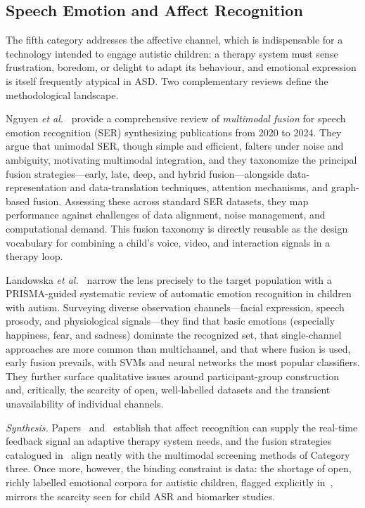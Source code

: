 \documentclass[conference]{IEEEtran}
\begin{document}
\subsection{Speech Emotion and Affect Recognition}
The fifth category addresses the affective channel, which is indispensable for a technology intended to engage autistic children: a therapy system must sense frustration, boredom, or delight to adapt its behaviour, and emotional expression is itself frequently atypical in ASD. Two complementary reviews define the methodological landscape.

Nguyen \textit{et al.}~\cite{ref18} provide a comprehensive review of \emph{multimodal fusion} for speech emotion recognition (SER) synthesizing publications from 2020 to 2024. They argue that unimodal SER, though simple and efficient, falters under noise and ambiguity, motivating multimodal integration, and they taxonomize the principal fusion strategies---early, late, deep, and hybrid fusion---alongside data-representation and data-translation techniques, attention mechanisms, and graph-based fusion. Assessing these across standard SER datasets, they map performance against challenges of data alignment, noise management, and computational demand. This fusion taxonomy is directly reusable as the design vocabulary for combining a child's voice, video, and interaction signals in a therapy loop.

Landowska \textit{et al.}~\cite{ref19} narrow the lens precisely to the target population with a PRISMA-guided systematic review of automatic emotion recognition in children with autism. Surveying diverse observation channels---facial expression, speech prosody, and physiological signals---they find that basic emotions (especially happiness, fear, and sadness) dominate the recognized set, that single-channel approaches are more common than multichannel, and that where fusion is used, early fusion prevails, with SVMs and neural networks the most popular classifiers. They further surface qualitative issues around participant-group construction and, critically, the scarcity of open, well-labelled datasets and the transient unavailability of individual channels.

\emph{Synthesis.} Papers~\cite{ref18} and~\cite{ref19} establish that affect recognition can supply the real-time feedback signal an adaptive therapy system needs, and the fusion strategies catalogued in~\cite{ref18} align neatly with the multimodal screening methods of Category three. Once more, however, the binding constraint is data: the shortage of open, richly labelled emotional corpora for autistic children, flagged explicitly in~\cite{ref19}, mirrors the scarcity seen for child ASR and biomarker studies.
\end{document}
